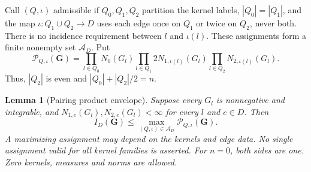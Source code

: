 \documentclass[12pt,oneside,openany]{book}
\makeatletter
\let\lean@pending\@empty
\newcommand{\LeanMarker}[1]{\gdef\lean@pending{#1}}
\numberwithin{equation}{section}
\newtheorem{lemma}[theorem]{Lemma}
\theoremstyle{nogostyle}
\theoremstyle{definition}
\makeatother
\begin{document}
Call $(Q,\iota)$ admissible if $Q_0,Q_1,Q_2$ partition the kernel labels, $|Q_0|
= |Q_1|$, and the map $\iota:Q_1\cup Q_2 \to D$ uses each edge once on $Q_1$ or
twice on $Q_2$, never both. There is no incidence requirement between $l$ and
$\iota(l)$. These assignments form a finite nonempty set $\mathcal{A}_D$. Put
\begin{equation}\label{E:pairing-product-general}
  \mathcal{P}_{Q,\iota}(\boldsymbol G)=
  \prod_{l\in Q_0}N_0(G_l)
  \prod_{l\in Q_1}2N_{1,\iota(l)}(G_l)
  \prod_{l\in Q_2}N_{2,\iota(l)}(G_l).
\end{equation}
Thus, $|Q_2|$ is even and $|Q_0|+|Q_2|/2 = n$.
\LeanMarker{L:pairing-product-envelope}%
\begin{lemma}[Pairing product envelope]\label{L:pairing-product-envelope}
  Suppose every $G_l$ is nonnegative and integrable, and
  $N_{1,e}(G_l),N_{2,e}(G_l) < \infty$ for every $l$ and $e \in D$. Then
  \begin{equation}\label{E:pairing-product-envelope}
    I_D(\boldsymbol G)\le
    \max_{(Q,\iota)\in\mathcal{A}_D}
    \mathcal{P}_{Q,\iota}(\boldsymbol G).
  \end{equation}
  A maximizing assignment may depend on the kernels and edge data. No single
  assignment valid for all kernel families is asserted. For $n = 0$, both sides
  are one. Zero kernels, measures and norms are allowed.
\end{lemma}
\end{document}
